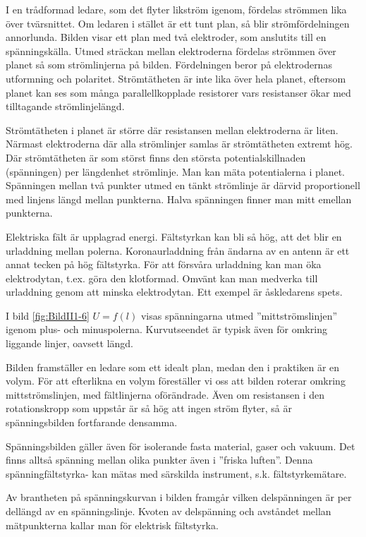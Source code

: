 I en trådformad ledare, som det flyter likström igenom, fördelas strömmen lika
över tvärsnittet.
Om ledaren i stället är ett tunt plan, så blir strömfördelningen annorlunda.
Bilden visar ett plan med två elektroder, som anslutits till en spänningskälla.
Utmed sträckan mellan elektroderna fördelas strömmen över planet så som
strömlinjerna på bilden.
Fördelningen beror på elektrodernas utformning och polaritet.
Strömtätheten är inte lika över hela planet, eftersom planet kan ses som många
parallellkopplade resistorer vars resistanser ökar med tilltagande
strömlinjelängd.

Strömtätheten i planet är större där resistansen mellan elektroderna är liten.
Närmast elektroderna där alla strömlinjer samlas är strömtätheten extremt hög.
Där strömtätheten är som störst finns den största potentialskillnaden
(spänningen) per längdenhet strömlinje.
Man kan mäta potentialerna i planet.
Spänningen mellan två punkter utmed en tänkt strömlinje är därvid proportionell
med linjens längd mellan punkterna.
Halva spänningen finner man mitt emellan punkterna.

Elektriska fält är upplagrad energi.
Fältstyrkan kan bli så hög, att det blir en urladdning mellan polerna.
Koronaurladdning från ändarna av en antenn är ett annat tecken på hög
fältstyrka.
För att försvåra urladdning kan man öka elektrodytan, t.ex. göra den klotformad.
Omvänt kan man medverka till urladdning genom att minska elektrodytan.
Ett exempel är åskledarens spets.

I bild \ref{fig:BildII1-6} \(U = f(l)\) visas spänningarna utmed
''mittströmslinjen'' igenom plus- och minuspolerna.
Kurvutseendet är typisk även för omkring liggande linjer, oavsett längd.

Bilden framställer en ledare som ett idealt plan, medan den i praktiken är en
volym.
För att efterlikna en volym föreställer vi oss att bilden roterar omkring
mittströmslinjen, med fältlinjerna oförändrade.
Även om resistansen i den rotationskropp som uppstår är så hög att ingen ström
flyter, så är spänningsbilden fortfarande densamma.

Spänningsbilden gäller även för isolerande fasta material, gaser och vakuum.
Det finns alltså spänning mellan olika punkter även i ''friska luften''.
Denna spänningfältstyrka- kan mätas med särskilda instrument, s.k.
fältstyrkemätare.

Av brantheten på spänningskurvan i bilden framgår vilken delspänningen är per
dellängd av en spänningslinje.
Kvoten av delspänning och avståndet mellan mätpunkterna kallar man för
elektrisk fältstyrka.

